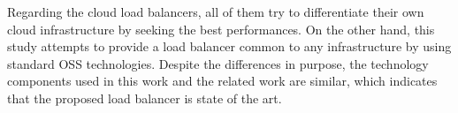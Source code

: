 Regarding the cloud load balancers, all of them try to differentiate their own cloud infrastructure by seeking the best performances.
On the other hand, this study attempts to provide a load balancer common to any infrastructure by using standard OSS technologies.
Despite the differences in purpose, the technology components used in this work and the related work are similar, which indicates that the proposed load balancer is state of the art.
